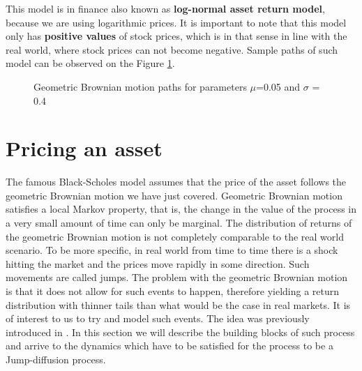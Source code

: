 \documentclass[times, utf8, diplomski]{fer}
\begin{document}
\noindent This model is in finance also known as \textbf{log-normal asset return model}, because we are using logarithmic prices. It is important to note that this model only has \textbf{positive values} of stock prices, which is in that sense in line with the real world, where stock prices can not become negative. Sample paths of such model can be observed on the Figure \ref{fig:gbm_paths}.
\vspace{1cm}
\begin{figure}[ht]
\centering
{}
\caption{Geometric Brownian motion paths for parameters $\mu$=0.05 and $\sigma$ = 0.4}
\label{fig:gbm_paths}
\end{figure}

\chapter{Pricing an asset}
The famous Black-Scholes model assumes that the price of the asset follows the geometric Brownian motion we have just covered. Geometric Brownian motion satisfies a local Markov property, that is, the change in the value of the process in a very small amount of time can only be marginal. The distribution of returns of the geometric Brownian motion is not completely comparable to the real world scenario. To be more specific, in real world from time to time there is a shock hitting the market and the prices move rapidly in some direction. Such movements are called jumps. The problem with the geometric Brownian motion is that it does not allow for such events to happen, therefore yielding a return distribution with thinner tails than what would be the case in real markets. It is of interest to us to try and model such events. The idea was previously introduced in \cite{merton_option_1976}. In this section we will describe the building blocks of such process and arrive to the dynamics which have to be satisfied for the process to be a Jump-diffusion process.
\end{document}
